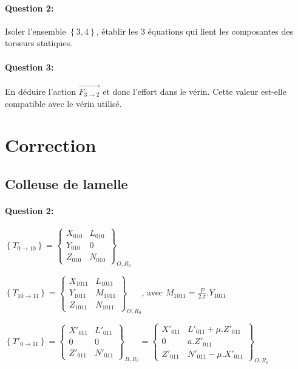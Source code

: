 \paragraph{Question 2:} Isoler l'ensemble $\left\{3,4\right\}$, établir les 3 équations qui lient les composantes des torseurs statiques.
 
\paragraph{Question 3:} En déduire l'action $\overrightarrow{F_{3\rightarrow 2}}$ et donc l'effort dans le vérin. Cette valeur est-elle compatible avec le vérin utilisé.

\ifdef{\public}{}{}

\clearpage

\newpage

\section{Correction}

\subsection{Colleuse de lamelle}

\paragraph{Question 2:} 

$\left\{T_{0\rightarrow 10}\right\}=\left\{
\begin{array}{cc}
X_{010} & L_{010} \\
Y_{010} & 0 \\
Z_{010} & N_{010}
\end{array}
\right\}_{O,R_0}$

$\left\{T_{10\rightarrow 11}\right\}=\left\{
\begin{array}{cc}
X_{1011} & L_{1011} \\
Y_{1011} & M_{1011} \\
Z_{1011} & N_{1011}
\end{array}
\right\}_{O,R_0}$, avec $M_{1011}=\frac{P}{2.\pi}.Y_{1011}$

$\left\{T'_{0\rightarrow 11}\right\}=\left\{
\begin{array}{cc}
X'_{011} & L'_{011} \\
0 & 0 \\
Z'_{011} & N'_{011}
\end{array}
\right\}_{B,R_0}=\left\{
\begin{array}{cc}
X'_{011} & L'_{011}+\mu.Z'_{011} \\
0 & a.Z'_{011} \\
Z'_{011} & N'_{011}-\mu.X'_{011}
\end{array}
\right\}_{O,R_0}$

